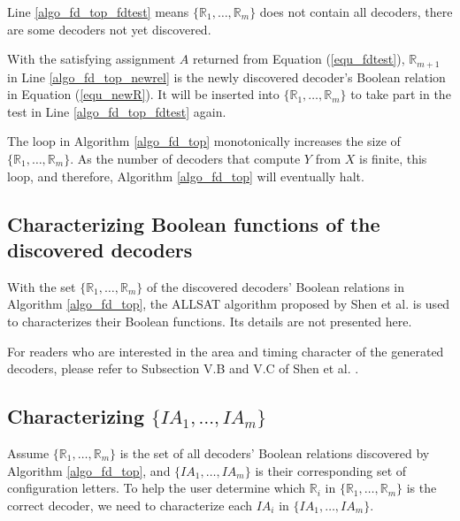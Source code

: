 \documentclass[journal]{IEEEtran}
\begin{document}

Line \ref{algo_fd_top_fdtest} means $\{\mathbb{R}_1,\dots,\mathbb{R}_m\}$ does not contain all decoders,
there are some decoders not yet discovered.

With the satisfying assignment $A$ returned from Equation (\ref{equ_fdtest}),
$\mathbb{R}_{m+1}$ in Line \ref{algo_fd_top_newrel} is the newly discovered decoder's Boolean relation in Equation (\ref{equ_newR}).
It will be inserted into $\{\mathbb{R}_1,\dots,\mathbb{R}_m\}$ to take part in the test in Line \ref{algo_fd_top_fdtest} again.

The loop in Algorithm \ref{algo_fd_top} monotonically increases the size of $\{\mathbb{R}_1,\dots,\mathbb{R}_m\}$.
As the number of decoders that compute $Y$ from $X$ is finite,
this loop,
and therefore,
Algorithm \ref{algo_fd_top} will eventually halt.

\subsection{Characterizing Boolean functions of the discovered decoders}
With the set $\{\mathbb{R}_1,\dots,\mathbb{R}_m\}$ of the discovered decoders' Boolean relations in Algorithm \ref{algo_fd_top},
the ALLSAT algorithm proposed by Shen et al. \cite{ShengYuShen:tcad} is  used to characterizes their Boolean functions.
Its details are not presented here.

For readers who are interested in the area and timing character of the generated decoders,
please refer to Subsection V.B and V.C of Shen et al. \cite{ShengYuShen:tcad11}.

\subsection{Characterizing $\{IA_1,\dots,IA_{m}\}$}\label{subsec_charia}
Assume $\{\mathbb{R}_1,\dots,\mathbb{R}_{m}\}$ is the set of all decoders' Boolean relations discovered by Algorithm \ref{algo_fd_top},
and $\{IA_1,\dots,IA_{m}\}$ is their corresponding set of configuration letters.
To help the user determine which $\mathbb{R}_i$ in $\{\mathbb{R}_1,\dots,\mathbb{R}_{m}\}$ is the correct decoder,
we need to characterize each $IA_i$ in $\{IA_1,\dots,IA_{m}\}$.
\end{document}
